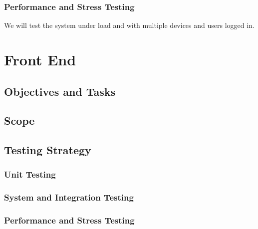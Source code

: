 \documentclass{article}
\begin{document}
		\subsubsection{Performance and Stress Testing}
			We will test the system under load and with multiple devices and users logged in.
		
\section{Front End}
	\subsection{Objectives and Tasks}
		
	\subsection{Scope}
		
	\subsection{Testing Strategy}
		\subsubsection{Unit Testing}
		\subsubsection{System and Integration Testing}
		\subsubsection{Performance and Stress Testing}
\end{document}
